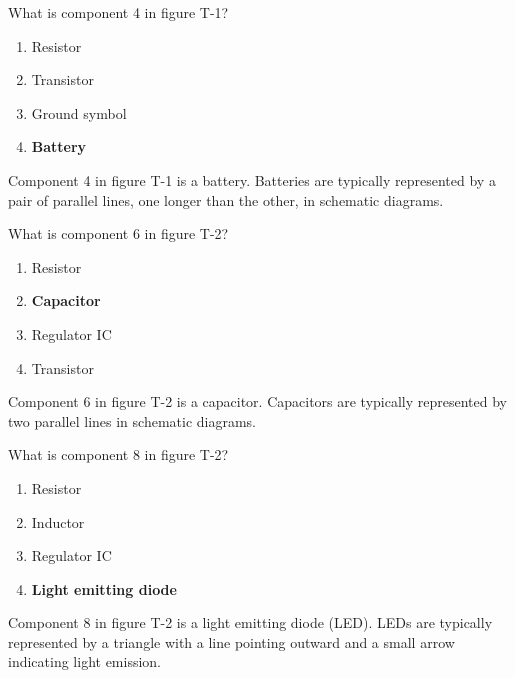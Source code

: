 \begin{tcolorbox}[colback=gray!10!white,colframe=black!75!black,title={T6C05}]
    What is component 4 in figure T-1?
    \begin{enumerate}[label=\Alph*),noitemsep]
        \item Resistor
        \item Transistor
        \item Ground symbol
        \item \textbf{Battery}
    \end{enumerate}
\end{tcolorbox}
Component 4 in figure T-1 is a battery. Batteries are typically represented by a pair of parallel lines, one longer than the other, in schematic diagrams.


\begin{tcolorbox}[colback=gray!10!white,colframe=black!75!black,title={T6C06}]
    What is component 6 in figure T-2?
    \begin{enumerate}[label=\Alph*),noitemsep]
        \item Resistor
        \item \textbf{Capacitor}
        \item Regulator IC
        \item Transistor
    \end{enumerate}
\end{tcolorbox}
Component 6 in figure T-2 is a capacitor. Capacitors are typically represented by two parallel lines in schematic diagrams.


\begin{tcolorbox}[colback=gray!10!white,colframe=black!75!black,title={T6C07}]
    What is component 8 in figure T-2?
    \begin{enumerate}[label=\Alph*),noitemsep]
        \item Resistor
        \item Inductor
        \item Regulator IC
        \item \textbf{Light emitting diode}
    \end{enumerate}
\end{tcolorbox}
Component 8 in figure T-2 is a light emitting diode (LED). LEDs are typically represented by a triangle with a line pointing outward and a small arrow indicating light emission.



